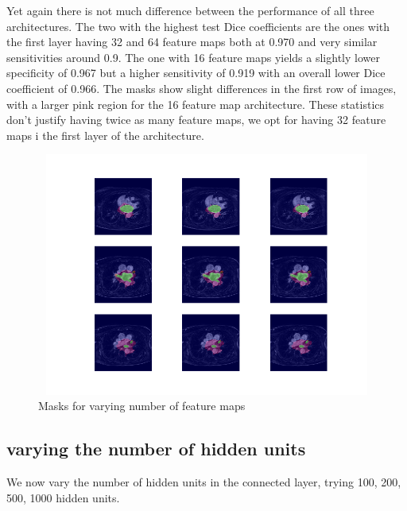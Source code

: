 \noindent Yet again there is not much difference between the performance of all three architectures. The two with the highest test Dice coefficients are the ones with the first layer having 32 and 64 feature maps both at 0.970 and very similar sensitivities around 0.9. The one with 16 feature maps yields a slightly lower specificity of 0.967 but a higher sensitivity of 0.919 with an overall lower Dice coefficient of 0.966. The masks show slight differences in the first row of images, with a larger pink region for the 16 feature map architecture. These statistics don't justify having twice as many feature maps, we opt for having 32 feature maps i the first layer of the architecture.

\begin{figure}
\centering
\includegraphics[trim=2.5cm 1.5cm 2cm 1.5cm, clip=true, height=80mm, width=150mm]{Chapter3/mask_results_varying_number_of_feature_maps.png}
\caption{Masks for varying number of feature maps}
\end{figure}

\subsection{varying the number of hidden units}

\noindent We now vary the number of hidden units in the connected layer, trying 100, 200, 500, 1000 hidden units. \\

